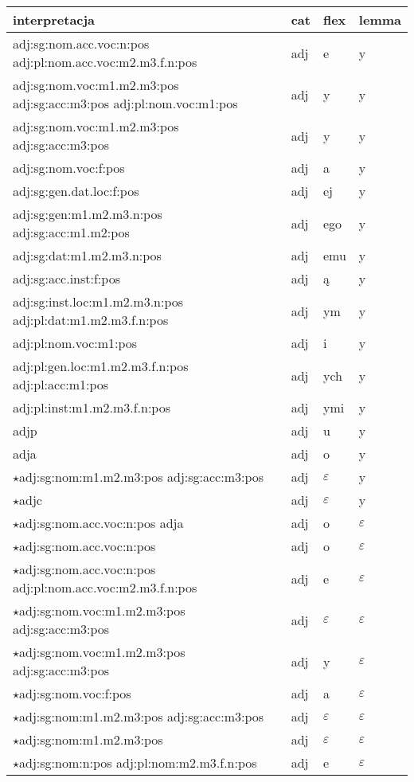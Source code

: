 \documentclass{article}
\begin{document}
\begin{longtable}{p{7cm}|l|l|l}
interpretacja & cat & flex & lemma\\
\hline
adj:sg:nom.acc.voc:n:pos adj:pl:nom.acc.voc:m2.m3.f.n:pos & adj & e & y\\
adj:sg:nom.voc:m1.m2.m3:pos adj:sg:acc:m3:pos adj:pl:nom.voc:m1:pos & adj & y & y\\
adj:sg:nom.voc:m1.m2.m3:pos adj:sg:acc:m3:pos & adj & y & y\\
adj:sg:nom.voc:f:pos & adj & a & y\\
adj:sg:gen.dat.loc:f:pos & adj & ej & y\\
adj:sg:gen:m1.m2.m3.n:pos adj:sg:acc:m1.m2:pos & adj & ego & y\\
adj:sg:dat:m1.m2.m3.n:pos & adj & emu & y\\
adj:sg:acc.inst:f:pos & adj & ą & y\\
adj:sg:inst.loc:m1.m2.m3.n:pos adj:pl:dat:m1.m2.m3.f.n:pos & adj & ym & y\\
adj:pl:nom.voc:m1:pos & adj & i & y\\
adj:pl:gen.loc:m1.m2.m3.f.n:pos adj:pl:acc:m1:pos & adj & ych & y\\
adj:pl:inst:m1.m2.m3.f.n:pos & adj & ymi & y\\
adjp & adj & u & y\\
adja & adj & o & y\\
$\star$adj:sg:nom:m1.m2.m3:pos adj:sg:acc:m3:pos & adj & $\varepsilon$ & y\\
$\star$adjc & adj & $\varepsilon$ & y\\
$\star$adj:sg:nom.acc.voc:n:pos adja & adj & o & $\varepsilon$\\
$\star$adj:sg:nom.acc.voc:n:pos & adj & o & $\varepsilon$\\
$\star$adj:sg:nom.acc.voc:n:pos adj:pl:nom.acc.voc:m2.m3.f.n:pos & adj & e & $\varepsilon$\\
$\star$adj:sg:nom.voc:m1.m2.m3:pos adj:sg:acc:m3:pos & adj & $\varepsilon$ & $\varepsilon$\\
$\star$adj:sg:nom.voc:m1.m2.m3:pos adj:sg:acc:m3:pos & adj & y & $\varepsilon$\\
$\star$adj:sg:nom.voc:f:pos & adj & a & $\varepsilon$\\
$\star$adj:sg:nom:m1.m2.m3:pos adj:sg:acc:m3:pos & adj & $\varepsilon$ & $\varepsilon$\\
$\star$adj:sg:nom:m1.m2.m3:pos & adj & $\varepsilon$ & $\varepsilon$\\
$\star$adj:sg:nom:n:pos adj:pl:nom:m2.m3.f.n:pos & adj & e & $\varepsilon$\\

\end{longtable}
\end{document}
